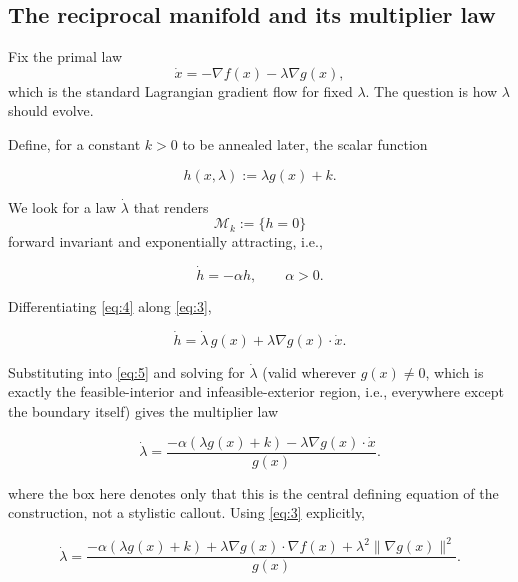 \documentclass[11pt,onecolumn]{article}
\theoremstyle{definition}
\theoremstyle{remark}
\begin{document}
\subsection{The reciprocal manifold and its multiplier law}

Fix the primal law
\begin{equation}
\dot{x}=-\nabla f(x)-\lambda \nabla g(x),
\label{eq:3}
\end{equation}
which is the standard Lagrangian gradient flow for fixed $\lambda$.
The question is how $\lambda$ should evolve.

Define, for a constant $k>0$ to be annealed later, the scalar function

\begin{equation}
h(x,\lambda):=\lambda g(x)+k.
\label{eq:4}
\end{equation}

We look for a law $\dot{\lambda}$ that renders
\[
\mathcal{M}_k:=\{h=0\}
\]
forward invariant and exponentially attracting, i.e.,

\begin{equation}
\dot{h}=-\alpha h,
\qquad \alpha>0.
\label{eq:5}
\end{equation}

Differentiating \eqref{eq:4} along \eqref{eq:3},

\begin{equation}
\dot{h}
=
\dot{\lambda}\,g(x)
+
\lambda \nabla g(x)\cdot\dot{x}.
\label{eq:6}
\end{equation}

Substituting into \eqref{eq:5} and solving for $\dot{\lambda}$
(valid wherever $g(x)\neq0$, which is exactly the feasible-interior and
infeasible-exterior region, i.e., everywhere except the boundary itself)
gives the multiplier law

\begin{equation}
\boxed{
\dot{\lambda}
=
\frac{
-\alpha\left(\lambda g(x)+k\right)
-\lambda \nabla g(x)\cdot\dot{x}
}{
g(x)
}.
}
\label{eq:7}
\end{equation}

where the box here denotes only that this is the central defining
equation of the construction, not a stylistic callout.
Using \eqref{eq:3} explicitly,

\begin{equation}
\dot{\lambda}
=
\frac{
-\alpha\left(\lambda g(x)+k\right)
+
\lambda \nabla g(x)\cdot\nabla f(x)
+
\lambda^{2}\|\nabla g(x)\|^{2}
}{
g(x)
}.
\label{eq:8}
\end{equation}
\end{document}
